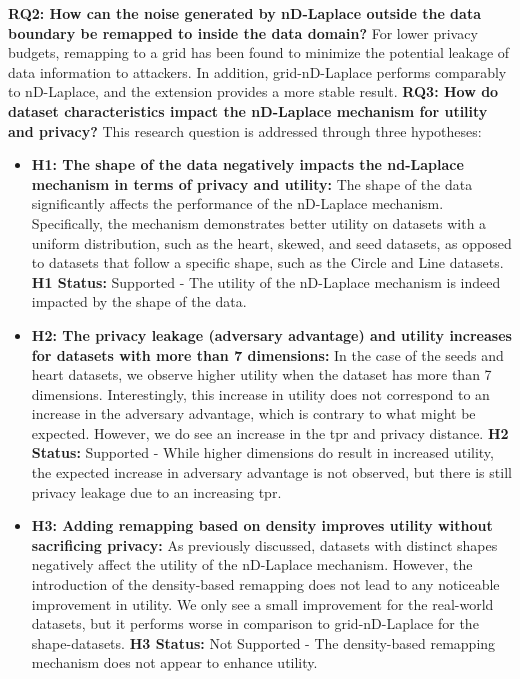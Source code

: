 \textbf{RQ2: How can the noise generated by nD-Laplace outside the data boundary be remapped to inside the data domain?} \newline
For lower privacy budgets, remapping to a grid has been found to minimize the potential leakage of data information to attackers.
In addition, grid-nD-Laplace performs comparably to nD-Laplace, and the extension provides a more stable result. \newline
\textbf{RQ3: How do dataset characteristics impact the nD-Laplace mechanism for utility and privacy?} \newline
This research question is addressed through three hypotheses:
\begin{itemize}
	\item \textbf{H1: The shape of the data negatively impacts the nd-Laplace mechanism in terms of privacy and utility:}
	The shape of the data significantly affects the performance of the nD-Laplace mechanism. Specifically, the mechanism demonstrates better utility on datasets with a uniform distribution, such as the heart, skewed, and seed datasets, as opposed to datasets that follow a specific shape, such as the Circle and Line datasets. \newline  
    \textbf{H1 Status:} Supported - The utility of the nD-Laplace mechanism is indeed impacted by the shape of the data.
	\item \textbf{H2: The privacy leakage (adversary advantage) and utility increases for datasets with more than 7 dimensions:}
	      In the case of the seeds and heart datasets, we observe higher utility when the dataset has more than 7 dimensions. Interestingly, this increase in utility does not correspond to an increase in the adversary advantage, which is contrary to what might be expected. However, we do see an increase in the \gls{tpr} and privacy distance. \newline \textbf{H2 Status:} Supported - While higher dimensions do result in increased utility, the expected increase in adversary advantage is not observed, but there is still privacy leakage due to an increasing \gls{tpr}.
	\item \textbf{H3: Adding remapping based on density improves utility without sacrificing privacy:}
	     As previously discussed, datasets with distinct shapes negatively affect the utility of the nD-Laplace mechanism. However, the introduction of the density-based remapping does not lead to any noticeable improvement in utility. We only see a small improvement for the real-world datasets, but it performs worse in comparison to grid-nD-Laplace for the shape-datasets. \newline \textbf{H3 Status:} Not Supported - The density-based remapping mechanism does not appear to enhance utility.
\end{itemize}

